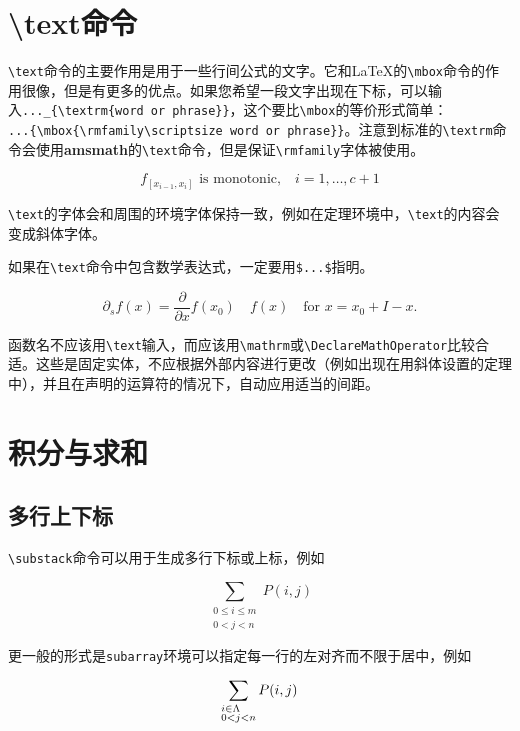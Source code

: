 \documentclass[openany]{ctexbook}
\begin{document}
\chapter{\textbackslash text命令}
\verb|\text|命令的主要作用是用于一些行间公式的文字。它和\LaTeX 的\verb|\mbox|命令的作用很像，但是有更多的优点。如果您希望一段文字出现在下标，可以输入\verb|..._{\textrm{word or phrase}}|，这个要比\verb|\mbox|的等价形式简单：\\
\verb|...{\mbox{\rmfamily\scriptsize word or phrase}}|。注意到标准的\verb|\textrm|命令会使用{\bfseries amsmath}的\verb|\text|命令，但是保证\verb|\rmfamily|字体被使用。
\begin{tcblisting}{}
\begin{equation}
f_{[x_{i-1},x_i]} \text{ is monotonic,}\quad i=1,\dots,c+1
\end{equation}
\end{tcblisting}

\verb|\text|的字体会和周围的环境字体保持一致，例如在定理环境中，\verb|\text|的内容会变成斜体字体。

如果在\verb|\text|命令中包含数学表达式，一定要用\verb|$...$|指明。
\begin{tcblisting}{}
\[\partial_sf(x)=\frac{\partial}{\partial x}f(x_0)\quad f(x)\quad
\text{for $x=x_0+I-x$.}\]
\end{tcblisting}

函数名不应该用\verb|\text|输入，而应该用\verb|\mathrm|或\verb|\DeclareMathOperator|比较合适。这些是固定实体，不应根据外部内容进行更改（例如出现在用斜体设置的定理中），并且在声明的运算符的情况下，自动应用适当的间距。
\chapter{积分与求和}
\section{多行上下标}
\verb|\substack|命令可以用于生成多行下标或上标，例如

\begin{listing}
\[
\sum_{\substack{
0\le i\le m\\
0<j<n}}
P(i,j)
\]
\end{listing}

更一般的形式是\verb|subarray|环境可以指定每一行的左对齐而不限于居中，例如
\begin{listing}
\[
\sum_{\begin{subarray}{l}
        i\in\Lambda\\ 0<j<n
      \end{subarray}}
P(i,j)
\]
\end{listing}
\end{document}
